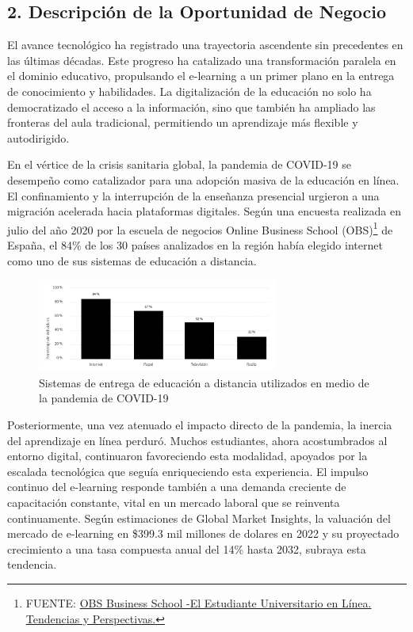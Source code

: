 \documentclass[
]{article}
\begin{document}
\newpage

\subsection{2. Descripción de la Oportunidad de
Negocio}\label{descripciuxf3n-de-la-oportunidad-de-negocio}

El avance tecnológico ha registrado una trayectoria ascendente sin
precedentes en las últimas décadas. Este progreso ha catalizado una
transformación paralela en el dominio educativo, propulsando el
e-learning a un primer plano en la entrega de conocimiento y
habilidades. La digitalización de la educación no solo ha democratizado
el acceso a la información, sino que también ha ampliado las fronteras
del aula tradicional, permitiendo un aprendizaje más flexible y
autodirigido.

En el vértice de la crisis sanitaria global, la pandemia de COVID-19 se
desempeño como catalizador para una adopción masiva de la educación en
línea. El confinamiento y la interrupción de la enseñanza presencial
urgieron a una migración acelerada hacia plataformas digitales. Según
una encuesta realizada en julio del año 2020 por la escuela de negocios
Online Business School (OBS)\footnote{FUENTE:
  \href{https://marketing.onlinebschool.es/Prensa/Informes/Informe\%20OBS\%20E-learning\%202022.pdf}{OBS
  Business School -El Estudiante Universitario en Línea. Tendencias y
  Perspectivas.}} de España, el 84\% de los 30 países analizados en la
región había elegido internet como uno de sus sistemas de educación a
distancia.

\begin{figure}
\centering
\includegraphics[width=0.7\textwidth,height=\textheight]{img/internet_ante_papel.png}
\caption{Sistemas de entrega de educación a distancia utilizados en
medio de la pandemia de COVID-19}
\end{figure}

Posteriormente, una vez atenuado el impacto directo de la pandemia, la
inercia del aprendizaje en línea perduró. Muchos estudiantes, ahora
acostumbrados al entorno digital, continuaron favoreciendo esta
modalidad, apoyados por la escalada tecnológica que seguía enriqueciendo
esta experiencia. El impulso continuo del e-learning responde también a
una demanda creciente de capacitación constante, vital en un mercado
laboral que se reinventa continuamente. Según estimaciones de Global
Market Insights, la valuación del mercado de e-learning en \$399.3 mil
millones de dolares en 2022 y su proyectado crecimiento a una tasa
compuesta anual del 14\% hasta 2032, subraya esta tendencia.
\end{document}
